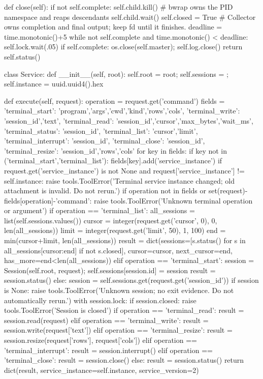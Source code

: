     def close(self):
        if not self.complete:
            self.child.kill()  # bwrap owns the PID namespace and reaps descendants
            self.child.wait()
        self.closed = True
        # Collector owns completion and final output; keep fd until it finishes.
        deadline = time.monotonic()+5
        while not self.complete and time.monotonic() < deadline: self.lock.wait(.05)
        if self.complete:
            os.close(self.master); self.log.close()
        return self.status()


class Service:
    def __init__(self, root):
        self.root = root; self.sessions = {}; self.instance = uuid.uuid4().hex

    def execute(self, request):
        operation = request.get('command')
        fields = {
            'terminal_start': {'program','args','cwd','kind','rows','cols'},
            'terminal_write': {'session_id','text'},
            'terminal_read': {'session_id','cursor','max_bytes','wait_ms'},
            'terminal_status': {'session_id'}, 'terminal_list': {'cursor','limit'},
            'terminal_interrupt': {'session_id'}, 'terminal_close': {'session_id'},
            'terminal_resize': {'session_id','rows','cols'}}
        for key in fields:
            if key not in ('terminal_start','terminal_list'): fields[key].add('service_instance')
        if request.get('service_instance') is not None and request['service_instance'] != self.instance:
            raise tools.ToolError('Terminal service instance changed; old attachment is invalid. Do not rerun.')
        if operation not in fields or set(request)-fields[operation]-{'command'}:
            raise tools.ToolError('Unknown terminal operation or argument')
        if operation == 'terminal_list':
            all_sessions = list(self.sessions.values())
            cursor = integer(request.get('cursor', 0), 0, len(all_sessions))
            limit = integer(request.get('limit', 50), 1, 100)
            end = min(cursor+limit, len(all_sessions))
            result = dict(sessions=[s.status() for s in all_sessions[cursor:end] if not s.closed],
                          cursor=cursor, next_cursor=end, has_more=end<len(all_sessions))
        elif operation == 'terminal_start':
            session = Session(self.root, request); self.sessions[session.id] = session
            result = session.status()
        else:
            session = self.sessions.get(request.get('session_id'))
            if session is None: raise tools.ToolError('Unknown session; no exit evidence. Do not automatically rerun.')
            with session.lock:
                if session.closed: raise tools.ToolError('Session is closed')
                if operation == 'terminal_read': result = session.read(request)
                elif operation == 'terminal_write': result = session.write(request['text'])
                elif operation == 'terminal_resize': result = session.resize(request['rows'], request['cols'])
                elif operation == 'terminal_interrupt': result = session.interrupt()
                elif operation == 'terminal_close': result = session.close()
                else: result = session.status()
        return dict(result, service_instance=self.instance, service_version=2)


